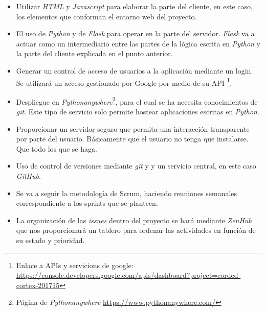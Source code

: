 \begin{itemize}
	\item Utilizar \textit{HTML} y \textit{Javascript} para elaborar la parte del cliente, en este caso, los elementos que conforman el entorno web del proyecto.
	
	\item El uso de \textit{Python} y de \textit{Flask} para operar en la parte del servidor. \textit{Flask} va a actuar como un intermediario entre las partes de la lógica escrita en \textit{Python} y la parte del cliente explicada en el punto anterior.
	
	\item Generar un control de acceso de usuarios a la aplicación mediante un login. Se utilizará un acceso gestionado por Google por medio de su API \footnote{Enlace a APIs y servicions de google: \url{https://console.developers.google.com/apis/dashboard?project=corded-cortex-201715}}.
	
	\item Despliegue en \textit{Pythonanywhere}\footnote{Página de \textit{Pythonanywhere} \url{https://www.pythonanywhere.com/}}, para el cual se ha necesita conocimientos de \textit{git}. Este tipo de servicio solo permite hostear aplicaciones escritas en \textit{Python}.
	
	\item Proporcionar un servidor seguro que permita una interacción transparente por parte del usuario. Básicamente que el usuario no tenga que instalarse. Que todo los que se haga.
	
	\item Uso de control de versiones mediante \textit{git} y y un servicio central, en este caso \textit{GitHub}.
	
	\item Se va a seguir la metodología de Scrum, haciendo reuniones semanales correspondiente a los sprints que se planteen. 
	
	\item La organización de las \textit{issues} dentro del proyecto se hará mediante \textit{ZenHub} que nos proporcionará un tablero para ordenar las actividades en función de su estado y prioridad.
	
\end{itemize}